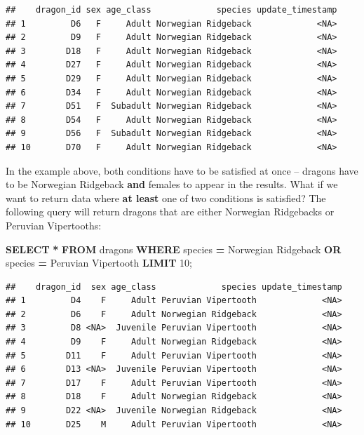 \documentclass[
]{book}
\newenvironment{Shaded}{\begin{snugshade}}{\end{snugshade}}
\newcommand{\DecValTok}[1]{\textcolor[rgb]{0.00,0.00,0.81}{#1}}
\newcommand{\KeywordTok}[1]{\textcolor[rgb]{0.13,0.29,0.53}{\textbf{#1}}}
\newcommand{\NormalTok}[1]{#1}
\newcommand{\OperatorTok}[1]{\textcolor[rgb]{0.81,0.36,0.00}{\textbf{#1}}}
\newcommand{\StringTok}[1]{\textcolor[rgb]{0.31,0.60,0.02}{#1}}
\begin{document}
\begin{verbatim}
##    dragon_id sex age_class             species update_timestamp
## 1         D6   F     Adult Norwegian Ridgeback             <NA>
## 2         D9   F     Adult Norwegian Ridgeback             <NA>
## 3        D18   F     Adult Norwegian Ridgeback             <NA>
## 4        D27   F     Adult Norwegian Ridgeback             <NA>
## 5        D29   F     Adult Norwegian Ridgeback             <NA>
## 6        D34   F     Adult Norwegian Ridgeback             <NA>
## 7        D51   F  Subadult Norwegian Ridgeback             <NA>
## 8        D54   F     Adult Norwegian Ridgeback             <NA>
## 9        D56   F  Subadult Norwegian Ridgeback             <NA>
## 10       D70   F     Adult Norwegian Ridgeback             <NA>
\end{verbatim}

In the example above, both conditions have to be satisfied at once -- dragons
have to be Norwegian Ridgeback \textbf{and} females to appear in the results. What if
we want to return data where \textbf{at least} one of two conditions is satisfied?
The following query will return dragons that are either Norwegian Ridgebacks or
Peruvian Vipertooths:

\begin{Shaded}
\begin{Highlighting}[]
\KeywordTok{SELECT} \OperatorTok{*} 
\KeywordTok{FROM}\NormalTok{ dragons}
\KeywordTok{WHERE}\NormalTok{ species }\OperatorTok{=} \StringTok{\textquotesingle{}Norwegian Ridgeback\textquotesingle{}} \KeywordTok{OR}\NormalTok{ species }\OperatorTok{=} \StringTok{\textquotesingle{}Peruvian Vipertooth\textquotesingle{}}
\KeywordTok{LIMIT} \DecValTok{10}\NormalTok{;}
\end{Highlighting}
\end{Shaded}

\begin{verbatim}
##    dragon_id  sex age_class             species update_timestamp
## 1         D4    F     Adult Peruvian Vipertooth             <NA>
## 2         D6    F     Adult Norwegian Ridgeback             <NA>
## 3         D8 <NA>  Juvenile Peruvian Vipertooth             <NA>
## 4         D9    F     Adult Norwegian Ridgeback             <NA>
## 5        D11    F     Adult Peruvian Vipertooth             <NA>
## 6        D13 <NA>  Juvenile Peruvian Vipertooth             <NA>
## 7        D17    F     Adult Peruvian Vipertooth             <NA>
## 8        D18    F     Adult Norwegian Ridgeback             <NA>
## 9        D22 <NA>  Juvenile Norwegian Ridgeback             <NA>
## 10       D25    M     Adult Peruvian Vipertooth             <NA>
\end{verbatim}
\end{document}
